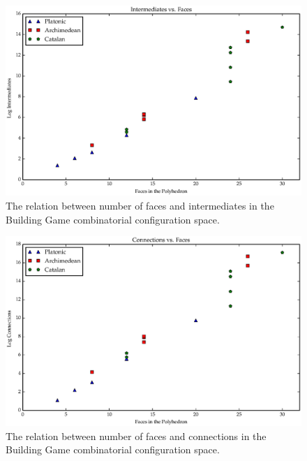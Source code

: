 



\begin{figure}[ht]
\centering
  \includegraphics[scale=0.6, angle=0]{images/polys_face_int.eps}
\caption{The relation between number of faces and intermediates in the Building Game combinatorial configuration space.}
\label{fig:FacInt}
\end{figure}

\begin{figure}[ht]
\includegraphics[scale=0.6, angle=0]{images/polys_face_con.eps}
\caption{The relation between number of faces and connections in the Building Game combinatorial configuration space.}
\label{fig:FacCon}
\end{figure}

